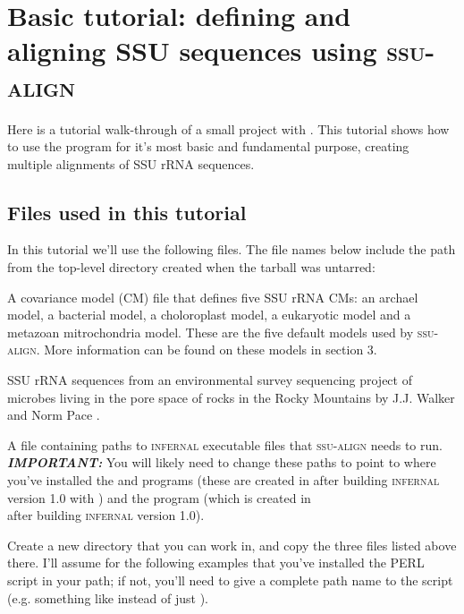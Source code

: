 \section{Basic tutorial: defining and aligning SSU sequences using \textsc{ssu-align}}

Here is a tutorial walk-through of a small project with
. This tutorial shows how to use the program for
it's most basic and fundamental purpose, creating multiple
alignments of SSU rRNA sequences. 

\subsection{Files used in this tutorial}

In this tutorial we'll use the following files. The file names below
include the path from the top-level  directory
created when the  tarball was untarred:

  \begin{sreitems}{}
  \item[\prog{./seeds/ssu5-0p1.cm}] A covariance model (CM) file that
    defines five SSU rRNA CMs: an archael model, a bacterial model, a
    choloroplast model, a eukaryotic model and a metazoan
    mitrochondria model. These are the five default models used by
    \textsc{ssu-align}. More information can be found on these models
    in section 3.
  \item[\prog{tutorial/rocks.fa}] SSU rRNA sequences from an environmental
    survey sequencing project of microbes living in the pore space of
    rocks in the Rocky Mountains by J.J. Walker and Norm Pace
    \cite{Walker07}. 
  \item[\prog{./sa-0p1.params}] A file containing paths to
    \textsc{infernal} executable files that \textsc{ssu-align} needs
    to run. \textbf{\emph{IMPORTANT:}} You will likely need to change
    these paths to point to where you've installed the 
    and  programs (these are created in
     after building \textsc{infernal} version
    1.0 with ) and the 
    program (which is created in \\ 
    after building \textsc{infernal} version 1.0).
  \end{sreitems}

Create a new directory that you can work in, and copy the three
files listed above there. I'll assume for the following examples that you've
installed the  PERL script in your path; if not, you'll
need to give a complete path name to the script (e.g. something like
\newline
{} 
instead of just ).


